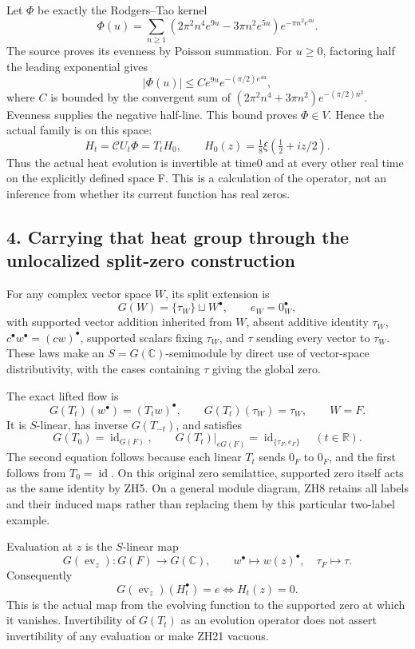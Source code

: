 \documentclass[
  10pt,
  a4paper,
]{article}
\begin{document}
Let \(\Phi\) be exactly the Rodgers--Tao kernel \[
\Phi(u)=\sum_{n\ge1}(2\pi^2n^4e^{9u}-3\pi n^2e^{5u})e^{-\pi n^2e^{4u}}.
\tag{ZH14}
\] The source proves its evenness by Poisson summation. For \(u\ge0\),
factoring half the leading exponential gives \[
|\Phi(u)|\le C e^{9u}e^{-(\pi/2)e^{4u}},
\tag{ZH15}
\] where \(C\) is bounded by the convergent sum of
\((2\pi^2n^4+3\pi n^2)e^{-(\pi/2)n^2}\). Evenness supplies the negative
half-line. This bound proves \(\Phi\in V\). Hence the actual family is
on this space: \[
H_t=\mathcal C U_t\Phi=T_tH_0,\qquad
H_0(z)=\tfrac18\xi(\tfrac12+iz/2).
\tag{ZH16}
\] Thus the actual heat evolution is invertible at time0 and at every
other real time on the explicitly defined space F. This is a calculation
of the operator, not an inference from whether its current function has
real zeros.

\subsection{4. Carrying that heat group through the unlocalized
split-zero
construction}\label{carrying-that-heat-group-through-the-unlocalized-split-zero-construction}

For any complex vector space \(W\), its split extension is \[
G(W)=\{\tau_W\}\sqcup W^\bullet,\qquad e_W=0_W^\bullet,
\tag{ZH17}
\] with supported vector addition inherited from \(W\), absent additive
identity \(\tau_W\), \(c^\bullet w^\bullet=(cw)^\bullet\), supported
scalars fixing \(\tau_W\), and \(\tau\) sending every vector to
\(\tau_W\). These laws make an \(S=G(\mathbb C)\)-semimodule by direct
use of vector-space distributivity, with the cases containing \(\tau\)
giving the global zero.

The exact lifted flow is \[
G(T_t)(w^\bullet)=(T_tw)^\bullet,\qquad
G(T_t)(\tau_W)=\tau_W,\qquad W=F.
\tag{ZH18}
\] It is \(S\)-linear, has inverse \(G(T_{-t})\), and satisfies \[
G(T_0)=\operatorname{id}_{G(F)},\qquad
G(T_t)|_{eG(F)}=\operatorname{id}_{\{\tau_F,e_F\}}\quad(t\in\mathbb R).
\tag{ZH19}
\] The second equation follows because each linear \(T_t\) sends \(0_F\)
to \(0_F\), and the first follows from \(T_0=\operatorname{id}\). On
this original zero semilattice, supported zero itself acts as the same
identity by ZH5. On a general module diagram, ZH8 retains all labels and
their induced maps rather than replacing them by this particular
two-label example.

Evaluation at \(z\) is the \(S\)-linear map \[
G(\operatorname{ev}_z):G(F)\to G(\mathbb C),\qquad
w^\bullet\mapsto w(z)^\bullet,\quad\tau_F\mapsto\tau.
\tag{ZH20}
\] Consequently \[
G(\operatorname{ev}_z)(H_t^\bullet)=e\iff H_t(z)=0.
\tag{ZH21}
\] This is the actual map from the evolving function to the supported
zero at which it vanishes. Invertibility of \(G(T_t)\) as an evolution
operator does not assert invertibility of any evaluation or make ZH21
vacuous.
\end{document}
